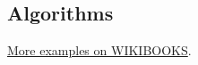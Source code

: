 \subsection{Algorithms}
\label{ss:Algorithms}
\href{http://en.wikibooks.org/wiki/LaTeX/Algorithms_and_Pseudocode}{More examples on WIKIBOOKS}.

